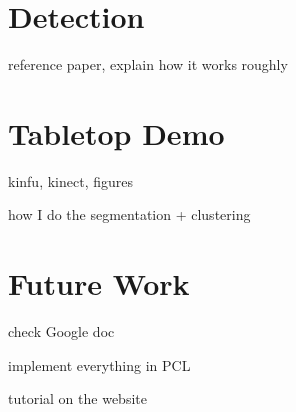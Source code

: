 \documentclass{article}
\begin{document}
\section {Detection}

reference paper, explain how it works roughly


\section {Tabletop Demo}

kinfu, kinect, figures

how I do the segmentation + clustering


\section {Future Work}

check Google doc

implement everything in PCL

tutorial on the website
\end{document}
